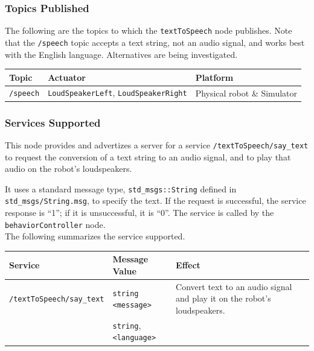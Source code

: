 \documentclass{CSSRforAfrica}
\begin{document}
{{\subsubsection*{Topics Published}
The following are the topics to which the {\small \verb+textToSpeech+} node publishes.  Note that the {\small \verb+/speech+}  topic  accepts a text string, not an audio signal, and works best with the English language.  Alternatives are being investigated.
 
\begin{center}
\begin{tabularx}{\linewidth}{| l | l | X|}
\hline 
{\small Topic }                               & {\small  Actuator}    &  {\small Platform}       \\
\hline
{\footnotesize \verb+/speech+ }  & {\footnotesize \verb+LoudSpeakerLeft+, \verb+LoudSpeakerRight+} & {\small Physical robot \& Simulator} \\ 
\hline
\end{tabularx}
\end{center}

\subsubsection*{Services Supported}
This node  provides and advertizes a server for a service {\small \verb+/textToSpeech/say_text+} to request the conversion of a text string to an audio signal, and to play that audio on the robot's loudspeakers.

It uses a standard message type, {\small \verb+std_msgs::String+} defined in {\small \verb+std_msgs/String.msg+}, to specify the text.  If the request is successful, the service response is ``1''; if it is unsuccessful, it is ``0''.  
The service is called by  the {\small \verb+behaviorController+} node. \\


\noindent The following summarizes the service supported.

\begin{center}
\begin{tabularx}{\linewidth}{| l | l | X|}
\hline 
{\small Service }                                                                                & {\small Message Value}    &  {\small Effect}       \\
\hline
{\footnotesize \verb+/textToSpeech/say_text+ }  & {\footnotesize \verb+string+ \verb+<message>+}  & {\small Convert text to an audio signal and play it on the robot's loudspeakers.} \\ 
    & {\footnotesize \verb+string+}, {\footnotesize \verb+<language>+}      &  \\ 
\hline
\end{tabularx}
\end{center}

}}
\end{document}
